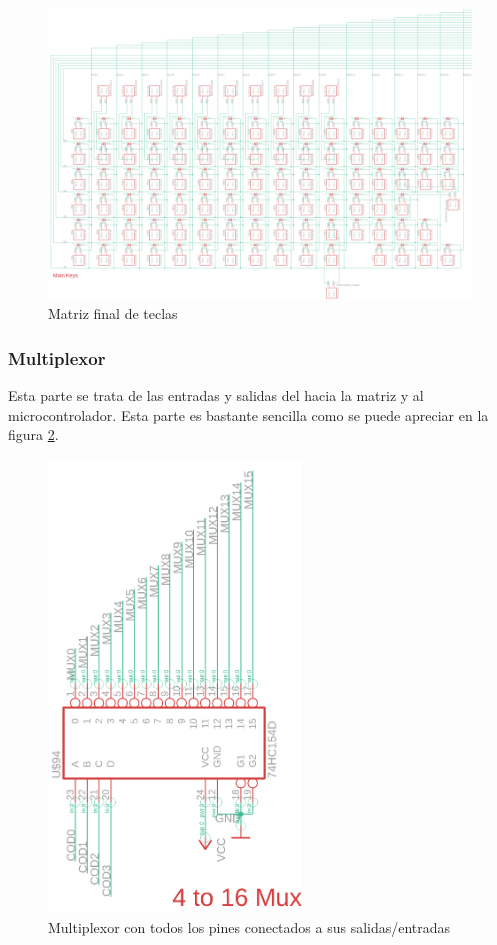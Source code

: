 \begin{figure}[H]
    \centering
    \includegraphics[width=1.0\textwidth]{imagenes/Capitulos/Cap04/MatrizTeclas.png}
    \caption{Matriz final de teclas}
    \label{fig:MatrizTeclas}
\end{figure}

\newpage
\subsubsection{\gls{Multiplexor}}
Esta parte se trata de las entradas y salidas del  hacia la matriz y al microcontrolador. Esta parte es bastante sencilla como se puede apreciar en la figura \ref{fig:MuxImagenCircuito}.

\begin{figure}[H]
    \centering
    \includegraphics[width=0.6\textwidth]{imagenes/Capitulos/Cap04/Mux.png}
    \caption{\gls{Multiplexor} con todos los pines conectados a sus salidas/entradas}
    \label{fig:MuxImagenCircuito}
\end{figure}

